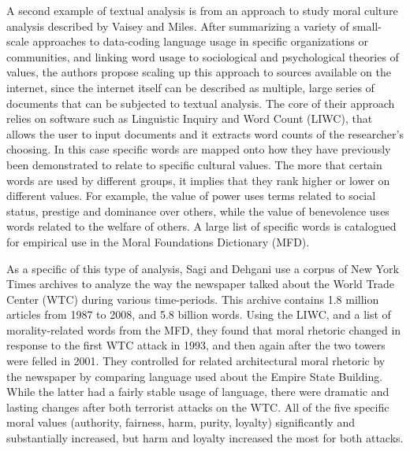 \documentclass[sigconf]{acmart}
\begin{document}
A second example of textual analysis is from an approach to study moral culture analysis described by Vaisey and Miles. \cite{vaisey14}  After summarizing a variety of small-scale approaches to data-coding language usage in specific organizations or communities, and linking word usage to sociological and psychological theories of values, the authors propose scaling up this approach to sources available on the internet, since the internet itself can be described as multiple, large series of documents that can be subjected to textual analysis.  The core of their approach relies on software such as Linguistic Inquiry and Word Count (LIWC), that allows the user to input documents and it extracts word counts of the researcher's choosing.  In this case specific words are mapped onto how they have previously been demonstrated to relate to specific cultural values.  The more that certain words are used by different groups, it implies that they rank higher or lower on different values.  For example, the value of power uses terms related to social status, prestige and dominance over others, while the value of benevolence uses words related to the welfare of others.  A large list of specific words is catalogued for empirical use in the Moral Foundations Dictionary (MFD).  \cite{vaisey14}  

As a specific of this type of analysis, Sagi and Dehgani use a corpus of New York Times archives to analyze the way the newspaper talked about the World Trade Center (WTC) during various time-periods. \cite{sagi14} This archive contains 1.8 million articles from 1987 to 2008, and 5.8 billion words.  Using the LIWC, and a list of morality-related words from the MFD, they found that moral rhetoric changed in response to the first WTC attack in 1993, and then again after the two towers were felled in 2001.  They controlled for related architectural moral rhetoric by the newspaper by comparing language used about the Empire State Building.  While the latter had a fairly stable usage of language, there were dramatic and lasting changes after both terrorist attacks on the WTC.  All of the five specific moral values (authority, fairness, harm, purity, loyalty) significantly and substantially increased, but harm and loyalty increased the most for both attacks.
\end{document}
